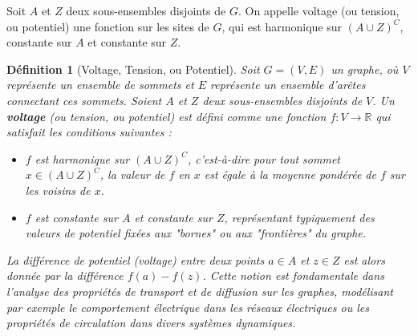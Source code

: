 \documentclass{article}
\theoremstyle{pasdepoint}
\newtheorem{definition}{Définition}
\theoremstyle{break}
\theoremstyle{pasdepoint}
\begin{document}
\pagebreak Soit \(A\) et \(Z\) deux sous-ensembles disjoints de \(G\). On appelle voltage (ou tension, ou potentiel) une fonction sur les sites de \(G\), qui est harmonique sur \((A \cup Z)^C\), constante sur \(A\) et constante sur \(Z\).

\begin{definition}[Voltage, Tension, ou Potentiel]
    Soit \(G = (V, E)\) un graphe, où \(V\) représente un ensemble de sommets et \(E\) représente un ensemble d'arêtes connectant ces sommets. Soient \(A\) et \(Z\) deux sous-ensembles disjoints de \(V\). Un \textbf{voltage} (ou tension, ou potentiel) est défini comme une fonction \(f: V \rightarrow \mathbb{R}\) qui satisfait les conditions suivantes :
    \begin{itemize}
        \item \(f\) est harmonique sur \((A \cup Z)^C\), c'est-à-dire pour tout sommet \(x \in (A \cup Z)^C\), la valeur de \(f\) en \(x\) est égale à la moyenne pondérée de \(f\) sur les voisins de \(x\).
        \item \(f\) est constante sur \(A\) et constante sur \(Z\), représentant typiquement des valeurs de potentiel fixées aux "bornes" ou aux "frontières" du graphe.
    \end{itemize}
    La différence de potentiel (voltage) entre deux points \(a \in A\) et \(z \in Z\) est alors donnée par la différence \(f(a) - f(z)\). Cette notion est fondamentale dans l'analyse des propriétés de transport et de diffusion sur les graphes, modélisant par exemple le comportement électrique dans les réseaux électriques ou les propriétés de circulation dans divers systèmes dynamiques.
\end{definition}
\end{document}
